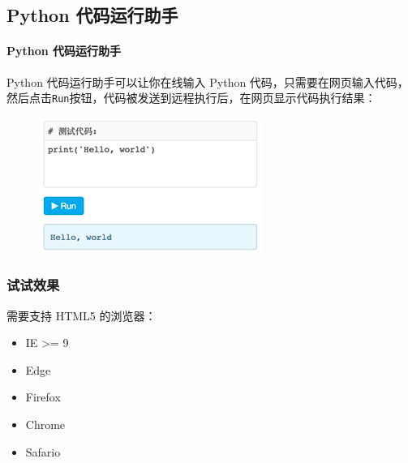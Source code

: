 \hypertarget{python-ux4ee3ux7801ux8fd0ux884cux52a9ux624b}{%
\subsection{Python
代码运行助手}\label{python-ux4ee3ux7801ux8fd0ux884cux52a9ux624b}}

\hypertarget{python-ux4ee3ux7801ux8fd0ux884cux52a9ux624b-1}{%
\paragraph{Python
代码运行助手}\label{python-ux4ee3ux7801ux8fd0ux884cux52a9ux624b-1}}

Python 代码运行助手可以让你在线输入 Python
代码，只需要在网页输入代码，然后点击\texttt{Run}按钮，代码被发送到远程执行后，在网页显示代码执行结果：

 
 \begin{figure}[htp]
	\centering
	\includegraphics[width=0.6\linewidth]{fig/1342562604417090l.png}
\end{figure}


\hypertarget{ux8bd5ux8bd5ux6548ux679c}{%
\subsubsection{试试效果}\label{ux8bd5ux8bd5ux6548ux679c}}

需要支持 HTML5 的浏览器：

\begin{itemize}
\item
  IE \textgreater= 9
\item
  Edge
\item
  Firefox
\item
  Chrome
\item
  Safario
\end{itemize}

